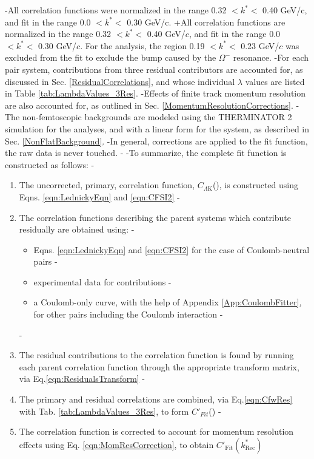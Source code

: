 \begin{table}[htbp]
\begin{table}[htbp]
-All correlation functions were normalized in the range 0.32 $< k^{*} <$ 0.40 GeV/c, and fit in the range 0.0 $< k^{*} <$ 0.30 GeV/c.
+All correlation functions are normalized in the range 0.32 $< k^{*} <$ 0.40 GeV/$c$, and fit in the range 0.0 $< k^{*} <$ 0.30 GeV/$c$.
 For the \LamKchM analysis, the region 0.19 $< k^{*} <$ 0.23 GeV/$c$ was excluded from the fit to exclude the bump caused by the $\Omega^{-}$ resonance.
-For each pair system, contributions from three residual contributors are accounted for, as discussed in Sec. \ref{ResidualCorrelations}, and whose individual $\lambda$ values are listed in Table \ref{tab:LambdaValues_3Res}.
-Effects of finite track momentum resolution are also accounted for, as outlined in Sec. \ref{MomentumResolutionCorrections}.
-The non-femtoscopic backgrounds are modeled using the THERMINATOR 2 simulation for the \LamKpm analyses, and with a linear form for the \LamKs system, as described in Sec. \ref{NonFlatBackground}.
-In general, corrections are applied to the fit function, the raw data is never touched.
-
-To summarize, the complete fit function is constructed as follows:
-\begin{enumerate}
- \item The uncorrected, primary, correlation function, $C_{\Lambda\mathrm{K}}$(\ktrue), is constructed using Eqns. \ref{eqn:LednickyEqn} and \ref{eqn:CFSI2}
- \item The correlation functions describing the parent systems which contribute residually are obtained using:
- \begin{itemize}
-  \item Eqns. \ref{eqn:LednickyEqn} and \ref{eqn:CFSI2} for the case of Coulomb-neutral pairs
-  \item \XiKpm experimental data for \XiKpm contributions
-  \item a Coulomb-only curve, with the help of Appendix \ref{App:CoulombFitter}, for other pairs including the Coulomb interaction 
- \end{itemize} 
- \item The residual contributions to the \LamK correlation function is found by running each parent correlation function through the appropriate transform matrix, via Eq.\ref{eqn:ResidualsTransform}
- \item The primary and residual correlations are combined, via Eq.\ref{eqn:CfwRes} with Tab. \ref{tab:LambdaValues_3Res}, to form $C'_{Fit}$(\ktrue)
- \item The correlation function is corrected to account for momentum resolution effects using Eq. \ref{eqn:MomResCorrection}, to obtain $C'_{\mathrm{Fit}}(k^{*}_{\mathrm{Rec}})$

\end{enumerate}
\end{table}
\end{table}
